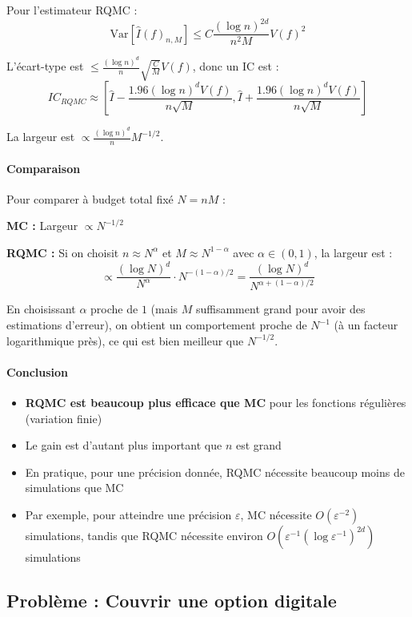\documentclass[12pt,a4paper]{article}
\theoremstyle{definition}
\theoremstyle{remark}
\newcommand{\Var}{\text{Var}}
\begin{document}
Pour l'estimateur RQMC :
\[
\Var[\hat{I}(f)_{n,M}] \leq C\frac{(\log n)^{2d}}{n^2 M} V(f)^2
\]

L'écart-type est $\leq \frac{(\log n)^d}{n}\sqrt{\frac{C}{M}} V(f)$, donc un IC est :
\[
IC_{RQMC} \approx \left[\hat{I} - \frac{1.96 (\log n)^d V(f)}{n\sqrt{M}}, \hat{I} + \frac{1.96 (\log n)^d V(f)}{n\sqrt{M}}\right]
\]

La largeur est $\propto \frac{(\log n)^d}{n} M^{-1/2}$.

\paragraph{Comparaison}

Pour comparer à budget total fixé $N = nM$ :

\textbf{MC :} Largeur $\propto N^{-1/2}$

\textbf{RQMC :} Si on choisit $n \approx N^\alpha$ et $M \approx N^{1-\alpha}$ avec $\alpha \in (0,1)$, la largeur est :
\[
\propto \frac{(\log N)^d}{N^\alpha} \cdot N^{-(1-\alpha)/2} = \frac{(\log N)^d}{N^{\alpha + (1-\alpha)/2}}
\]

En choisissant $\alpha$ proche de $1$ (mais $M$ suffisamment grand pour avoir des estimations d'erreur), on obtient un comportement proche de $N^{-1}$ (à un facteur logarithmique près), ce qui est bien meilleur que $N^{-1/2}$.

\paragraph{Conclusion}

\begin{itemize}
\item \textbf{RQMC est beaucoup plus efficace que MC} pour les fonctions régulières (variation finie)
\item Le gain est d'autant plus important que $n$ est grand
\item En pratique, pour une précision donnée, RQMC nécessite beaucoup moins de simulations que MC
\item Par exemple, pour atteindre une précision $\varepsilon$, MC nécessite $O(\varepsilon^{-2})$ simulations, tandis que RQMC nécessite environ $O(\varepsilon^{-1}(\log \varepsilon^{-1})^{2d})$ simulations
\end{itemize}

\subsection{Problème : Couvrir une option digitale}
\end{document}
